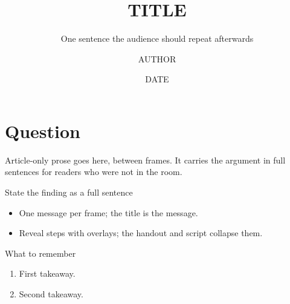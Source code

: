 \documentclass[
  beameroptions={aspectratio=169,ignorenonframetext,11pt},
  articleoptions={11pt,a4paper},
]{beamerswitch}
\title{{{TITLE}}}
\subtitle{One sentence the audience should repeat afterwards}
\author{{{AUTHOR}}}
\institute{Venue or event}
\date{{{DATE}}}
\begin{document}
\begin{frame}[plain]
  \titlepage
\end{frame}


\section{Question}

Article-only prose goes here, between frames. It carries the argument in full
sentences for readers who were not in the room.

\begin{frame}{State the finding as a full sentence}
  \begin{itemize}
    \item One message per frame; the title is the message.
    \item<2-> Reveal steps with overlays; the handout and script collapse them.
  \end{itemize}
\end{frame}

\begin{frame}{What to remember}
  \begin{enumerate}
    \item First takeaway.
    \item<2-> Second takeaway.
  \end{enumerate}
\end{frame}
\end{document}
